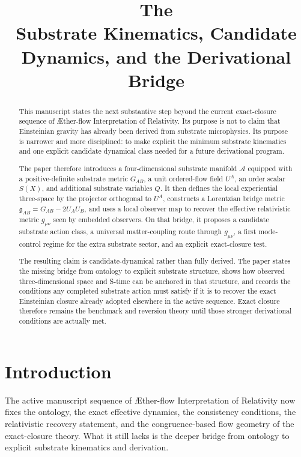 \documentclass[11pt]{article}
\title{\textbf{The \TheoryName{}}\\[0.4em]
\large Substrate Kinematics, Candidate Dynamics, and the Derivational Bridge}
\author{}
\date{}
\newcommand{\Aflow}{\AE{}ther-flow}
\newcommand{\TheoryName}{\Aflow{} Interpretation of Relativity}
\newcommand{\Sub}{\mathcal{A}}
\newcommand{\BridgeMetric}{\mathfrak{g}}
\begin{document}
\maketitle

\begin{abstract}
This manuscript states the next substantive step beyond the current exact-closure sequence of \TheoryName{}. Its purpose is not to claim that Einsteinian gravity has already been derived from substrate microphysics. Its purpose is narrower and more disciplined: to make explicit the minimum substrate kinematics and one explicit candidate dynamical class needed for a future derivational program.

The paper therefore introduces a four-dimensional substrate manifold \(\Sub\) equipped with a positive-definite substrate metric \(G_{AB}\), a unit ordered-flow field \(U^A\), an order scalar \(S(X)\), and additional substrate variables \(Q\). It then defines the local experiential three-space by the projector orthogonal to \(U^A\), constructs a Lorentzian bridge metric \(\BridgeMetric_{AB} = G_{AB} - 2 U_A U_B\), and uses a local observer map to recover the effective relativistic metric \(g_{\mu\nu}\) seen by embedded observers. On that bridge, it proposes a candidate substrate action class, a universal matter-coupling route through \(g_{\mu\nu}\), a first mode-control regime for the extra substrate sector, and an explicit exact-closure test.

The resulting claim is candidate-dynamical rather than fully derived. The paper states the missing bridge from ontology to explicit substrate structure, shows how observed three-dimensional space and S-time can be anchored in that structure, and records the conditions any completed substrate action must satisfy if it is to recover the exact Einsteinian closure already adopted elsewhere in the active sequence. Exact closure therefore remains the benchmark and reversion theory until those stronger derivational conditions are actually met.
\end{abstract}

\section{Introduction}

The active manuscript sequence of \TheoryName{} now fixes the ontology, the exact effective dynamics, the consistency conditions, the relativistic recovery statement, and the congruence-based flow geometry of the exact-closure theory. What it still lacks is the deeper bridge from ontology to explicit substrate kinematics and derivation.
\end{document}
